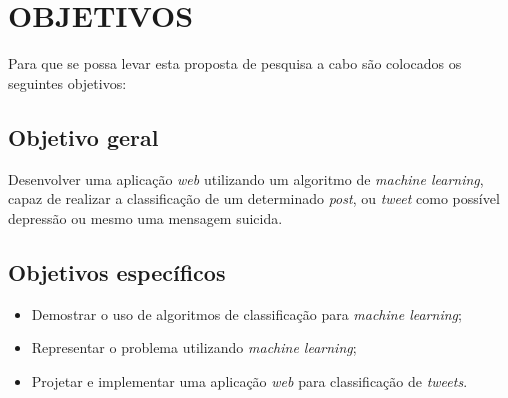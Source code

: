 \chapter{OBJETIVOS}

\par Para que se possa levar esta proposta de pesquisa a cabo são colocados os seguintes objetivos:

\section{Objetivo geral}

\par Desenvolver uma aplicação \textit{web} utilizando um algoritmo de \textit{machine learning}, capaz de realizar a classificação de um determinado \textit{post}, ou \textit{tweet} como possível depressão ou mesmo uma mensagem suicida.

\section{Objetivos específicos}

\begin{itemize}
	\item Demostrar o uso de algoritmos de classificação para \textit{machine learning};
	\item Representar o problema utilizando \textit{machine learning};
	\item Projetar e implementar uma aplicação \textit{web} para classificação de \textit{tweets}.
\end{itemize}
